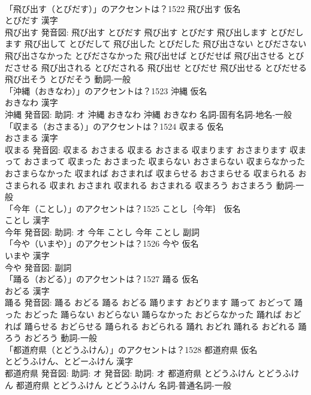 \documentclass[8pt]{extreport}
\begin{document}
\begin{CJK}{UTF8}{min}
\\	「飛び出す（とびだす）」のアクセントは？1522	飛び出す 仮名　
\\	とびだす 漢字　
\\	飛び出す 発音図:	飛び出す とびだす		飛び出す とびだす 飛び出します とびだします 飛び出して とびだして 飛び出した とびだした 飛び出さない とびださない 飛び出さなかった とびださなかった 飛び出せば とびだせば 飛び出させる とびださせる 飛び出される とびだされる 飛び出せ とびだせ 飛び出せる とびだせる 飛び出そう とびだそう				動詞-一般 
\\	「沖縄（おきなわ）」のアクセントは？1523	沖縄 仮名　
\\	おきなわ 漢字　
\\	沖縄 発音図: 助詞: オ	沖縄 おきなわ		沖縄 おきなわ				名詞-固有名詞-地名-一般 
\\	「収まる（おさまる）」のアクセントは？1524	収まる 仮名　
\\	おさまる 漢字　
\\	収まる 発音図:	収まる おさまる		収まる おさまる 収まります おさまります 収まって おさまって 収まった おさまった 収まらない おさまらない 収まらなかった おさまらなかった 収まれば おさまれば 収まらせる おさまらせる 収まられる おさまられる 収まれ おさまれ 収まれる おさまれる 収まろう おさまろう				動詞-一般 
\\	「今年（ことし）」のアクセントは？1525	ことし｛今年｝ 仮名　
\\	ことし 漢字　
\\	今年 発音図: 助詞: オ	今年 ことし		今年 ことし				副詞 
\\	「今や（いまや）」のアクセントは？1526	今や 仮名　
\\	いまや 漢字　
\\	今や 発音図:							副詞 
\\	「踊る（おどる）」のアクセントは？1527	踊る 仮名　
\\	おどる 漢字　
\\	踊る 発音図:	踊る おどる		踊る おどる 踊ります おどります 踊って おどって 踊った おどった 踊らない おどらない 踊らなかった おどらなかった 踊れば おどれば 踊らせる おどらせる 踊られる おどられる 踊れ おどれ 踊れる おどれる 踊ろう おどろう				動詞-一般 
\\	「都道府県（とどうふけん）」のアクセントは？1528	都道府県 仮名　
\\	とどうふけん、とどーふけん 漢字　
\\	都道府県 発音図: 助詞: オ 発音図: 助詞: オ	都道府県 とどうふけん とどうふけん		都道府県 とどうふけん とどうふけん				名詞-普通名詞-一般 

\end{CJK}
\end{document}
